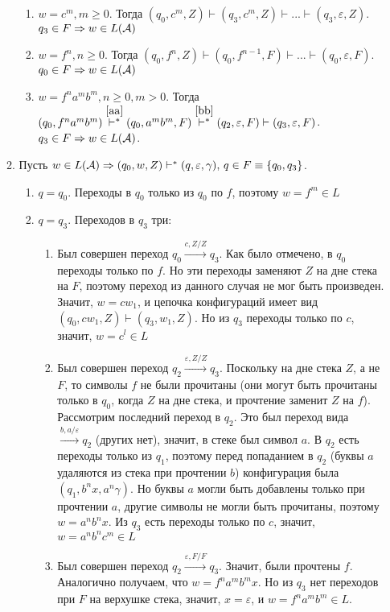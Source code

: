 \documentclass[a4paper]{article}
\def\A{{\cal A}}
\begin{document}
\begin{enumerate}
\begin{enumerate}
\begin{enumerate}
\item $w=c^m,m\geqslant 0$. Тогда $(q_0,c^m,Z)\vdash(q_3,c^m,Z)\vdash...\vdash(q_3,\varepsilon,Z)$. $q_3\in F\Rightarrow w\in L(\A)$
\item \label{aa} $w=f^n,n\geqslant 0$. Тогда $(q_0,f^n,Z)\vdash(q_0,f^{n-1},F)\vdash...\vdash(q_0,\varepsilon,F)$. $q_0\in F\Rightarrow w\in L(\A)$
\item $w=f^na^mb^m, n\geqslant 0, m>0$. Тогда $(q_0,f^na^mb^m)\overset{\ref{aa}}{\vdash^*}(q_0,a^mb^m,F)\overset{\ref{bb}}{\vdash^*}(q_2,\varepsilon,F)\vdash(q_3,\varepsilon,F)$. $q_3\in F\Rightarrow w\in L(\A)$.
\end{enumerate}
\item Пусть $w\in L(\A)\Rightarrow (q_0,w,Z)\vdash^*(q,\varepsilon,\gamma),\,q\in F\equiv\{q_0,q_3\}$.\begin{enumerate}
\item $q=q_0$. Переходы в $q_0$ только из $q_0$ по $f$, поэтому $w=f^m\in L$
\item $q=q_3$. Переходов в $q_3$ три:\begin{enumerate}
\item Был совершен переход $q_0\overset{c,Z/Z}{\longrightarrow}q_3$. Как было отмечено, в $q_0$ переходы только по $f$. Но эти переходы заменяют $Z$ на дне стека на $F$, поэтому переход из данного случая не мог быть произведен. Значит, $w=cw_1$, и цепочка конфигураций имеет вид $(q_0,cw_1,Z)\vdash(q_3,w_1,Z)$. Но из $q_3$ переходы только по $c$, значит, $w=c^l\in L$
\item Был совершен переход $q_2\overset{\varepsilon,Z/Z}{\longrightarrow}q_3$. Поскольку на дне стека $Z$, а не $F$, то символы $f$ не были прочитаны (они могут быть прочитаны только в $q_0$, когда $Z$ на дне стека, и прочтение заменит $Z$ на $f$). Рассмотрим последний переход в $q_2$. Это был переход вида $\overset{b,a/\varepsilon}{\longrightarrow}q_2$ (других нет), значит, в стеке был символ $a$. В $q_2$ есть переходы только из $q_1$, поэтому перед попаданием в $q_2$ (буквы $a$ удаляются из стека при прочтении $b$) конфигурация была $(q_1,b^nx,a^n\gamma)$. Но буквы $a$ могли быть добавлены только при прочтении $a$, другие символы не могли быть прочитаны, поэтому $w=a^nb^nx$. Из $q_3$ есть переходы только по $c$, значит, $w=a^nb^nc^m\in L$
\item Был совершен переход $q_2\overset{\varepsilon,F/F}{\longrightarrow}q_3$. Значит, были прочтены $f$. Аналогично получаем, что $w=f^na^mb^mx$. Но из $q_3$ нет переходов при $F$ на верхушке стека, значит, $x=\varepsilon$, и $w=f^na^mb^m\in L$.
\end{enumerate}
\end{enumerate}
\end{enumerate}
\end{enumerate}
\end{document}
